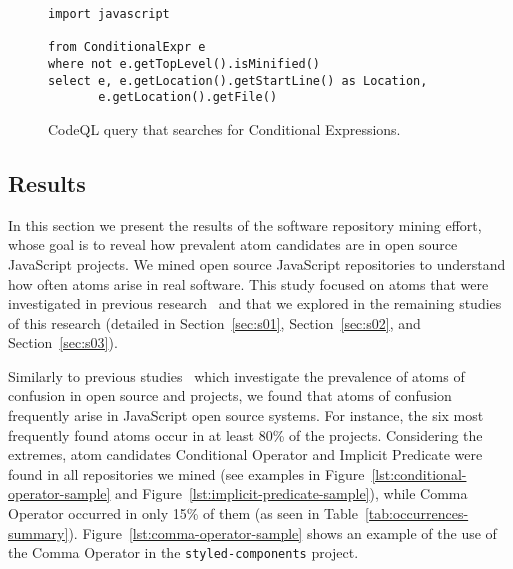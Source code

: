 \begin{figure}
\begin{lstlisting}[language=CodeQL]
import javascript

from ConditionalExpr e
where not e.getTopLevel().isMinified() 
select e, e.getLocation().getStartLine() as Location,
       e.getLocation().getFile()
\end{lstlisting}
\caption{CodeQL query that searches for Conditional Expressions.}
\label{lst:codeql}
\end{figure}



\subsection{Results}
\label{sec:msr-results} 

In this section we present the results of the  software repository
mining effort, whose goal is to reveal how prevalent atom candidates are in open source JavaScript projects. 
We mined \minedprojects open source JavaScript repositories to understand how
often atoms arise in real software. This study focused on atoms that were investigated in
previous research~\cite{DBLP:conf/sigsoft/GopsteinIYDZYC17} and that we explored in the remaining
studies of this research (detailed in Section~\ref{sec:s01}, Section~\ref{sec:s02}, and Section~\ref{sec:s03}).  


Similarly to previous studies~\cite{DBLP:journals/ese/MedeirosLAAKRG19,DBLP:conf/msr/GopsteinZFC18} which investigate
the prevalence of atoms of confusion in open source \clang and \cpplang projects, we found that atoms of confusion
frequently arise in JavaScript open source systems. For instance, the six most frequently found atoms
occur in at least 80\% of the projects. Considering the extremes, atom candidates Conditional Operator and
Implicit Predicate were found in all repositories we mined (see examples in Figure~\ref{lst:conditional-operator-sample}
and Figure~\ref{lst:implicit-predicate-sample}), while Comma Operator occurred in only 15\% of them (as seen in Table~\ref{tab:occurrences-summary}).
Figure~\ref{lst:comma-operator-sample} shows an example of the use of the Comma Operator in the \texttt{styled-components}
project.

